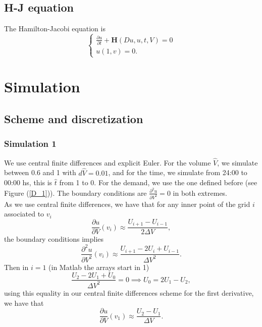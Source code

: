 \documentclass[12pt]{article}
\theoremstyle{definition}
\theoremstyle{remark}
\begin{document}
\subsection{H-J equation}

The Hamilton-Jacobi equation is
\begin{equation}
\begin{cases}
\frac{\partial u}{\partial t}+\mathbf{H}(Du,u,t,V)=0\\
u(1,v)=0.
\end{cases}
\label{HJ}
\end{equation}

\section{Simulation}

\subsection{Scheme and discretization}

\subsubsection{Simulation 1}

We use central finite differences and explicit Euler. For the volume $\hat{V}$, we simulate between 0.6 and 1 with $d\hat{V}=0.01$, and for the time, we simulate from 24:00 to 00:00 hs, this is $\hat{t}$ from 1 to 0. For the demand, we use the one defined before (see Figure (\ref{D_1})). The boundary conditions are $\frac{\partial^2 u}{\partial V^2}=0$ in both extremes.\\
As we use central finite differences, we have that for any inner point of the grid $i$ associated to $v_i$
\begin{equation*}
\frac{\partial u}{\partial V}(v_i)\approx\frac{U_{i+1}-U_{i-1}}{2\Delta V},
\end{equation*}
the boundary conditions implies
\begin{equation*}
\frac{\partial^2u}{\partial V^2}(v_i)\approx\frac{U_{i+1}-2U_i+U_{i-1}}{{\Delta V}^2}.
\end{equation*}
Then in $i=1$ (in Matlab the arrays start in 1)
\begin{equation*}
\frac{U_2-2U_1+U_0}{{\Delta V}^2}=0\implies U_0=2U_1-U_2,
\end{equation*}
using this equality in our central finite differences scheme for the first derivative, we have that
\begin{equation*}
\frac{\partial u}{\partial V}(v_1)\approx\frac{U_2-U_1}{\Delta V}.
\end{equation*}
\end{document}
